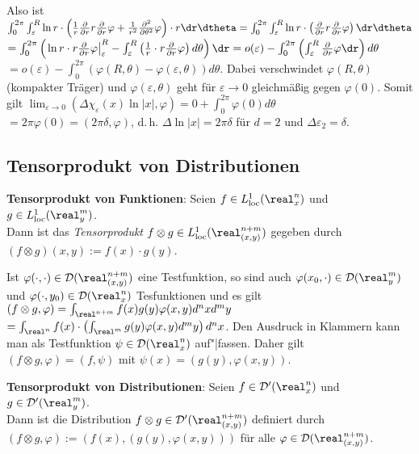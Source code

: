 Also ist
$\int_0^{2\pi} \int_\varepsilon^R
\ln r \cdot \left(\frac{1}{r} \frac{\partial}{\partial r} r
\frac{\partial}{\partial r} \varphi +
\frac{1}{r^2} \frac{\partial^2}{\partial \theta^2} \varphi\right) \cdot
r\dr\dtheta =
\int_0^{2\pi} \int_\varepsilon^R
\ln r \cdot \left(\frac{\partial}{\partial r} r
\frac{\partial}{\partial r} \varphi\right) \dr\dtheta$\\
$= \int_0^{2\pi} \left(\left.\ln r \cdot r
\frac{\partial}{\partial r} \varphi\right|_\varepsilon^R -
\int_\varepsilon^R \left(\frac{1}{r} \cdot
r \frac{\partial}{\partial r} \varphi\right)d\theta\right)\dr =
o(\varepsilon) - \int_0^{2\pi}
\left(\int_\varepsilon^R \frac{\partial}{\partial r}
\varphi \dr\right)d\theta$\\
$= o(\varepsilon) - \int_0^{2\pi}
\left(\varphi(R, \theta) - \varphi(\varepsilon, \theta)\right) d\theta$.
Dabei verschwindet $\varphi(R, \theta)$ (kompakter Träger) und
$\varphi(\varepsilon, \theta)$ geht für $\varepsilon \to 0$ gleichmäßig gegen
$\varphi(0)$.
Somit gilt
$\lim_{\varepsilon \to 0}
\left(\Delta \chi_\varepsilon(x)\ln |x|, \varphi\right) =
0 + \int_0^{2\pi} \varphi(0)d\theta$\\
$= 2\pi\varphi(0) = (2\pi\delta, \varphi)$,
d.\,h. $\Delta\ln|x| = 2\pi\delta$ für $d = 2$
und $\Delta \varepsilon_2 = \delta$.

\subsection{%
    Tensorprodukt von Distributionen%
}

\textbf{Tensorprodukt von Funktionen}:
Seien $f \in L^1_\loc(\real^n_x)$ und $g \in L^1_\loc(\real^m_y)$.\\
Dann ist das \emph{Tensorprodukt}
$f \otimes g \in L^1_\loc(\real^{n+m}_{(x,y)})$ gegeben durch
$(f \otimes g)(x, y) := f(x) \cdot g(y)$.

Ist $\varphi(\cdot, \cdot) \in \D(\real^{n+m}_{(x,y)})$
eine Testfunktion, so sind auch
$\varphi(x_0, \cdot) \in \D(\real^m_y)$ und
$\varphi(\cdot, y_0) \in \D(\real^n_x)$ Tesfunktionen und es gilt
$(f \otimes g, \varphi) = \int_{\real^{n+m}} f(x)g(y)\varphi(x, y)d^nxd^my$\\
$= \int_{\real^n} f(x) \cdot
\left(\int_{\real^m} g(y)\varphi(x, y)d^my\right)d^nx$.
Den Ausdruck in Klammern kann man als Testfunktion $\psi \in \D(\real^n_x)$
auf"|fassen.
Daher gilt $(f \otimes g, \varphi) = (f, \psi)$ mit
$\psi(x) = (g(y), \varphi(x, y))$.

\textbf{Tensorprodukt von Distributionen}:
Seien $f \in \D'(\real^n_x)$ und $g \in \D'(\real^m_y)$.\\
Dann ist die Distribution $f \otimes g \in \D'(\real^{n+m}_{(x,y)})$
definiert durch $(f \otimes g, \varphi) := (f(x), (g(y), \varphi(x, y)))$
für alle $\varphi \in \D(\real^{n+m}_{(x,y)})$.

